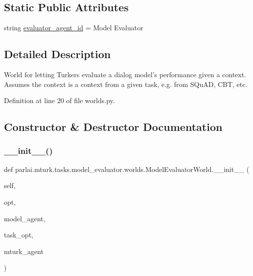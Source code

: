 \subsection*{Static Public Attributes}
\begin{DoxyCompactItemize}
\item 
string \hyperlink{classparlai_1_1mturk_1_1tasks_1_1model__evaluator_1_1worlds_1_1ModelEvaluatorWorld_aea1910aa8c33f072484f2328d1172c60}{evaluator\+\_\+agent\+\_\+id} = \textquotesingle{}Model Evaluator\textquotesingle{}
\end{DoxyCompactItemize}


\subsection{Detailed Description}
\begin{DoxyVerb}World for letting Turkers evaluate a dialog model's performance given a
context. Assumes the context is a context from a given task, e.g.
from SQuAD, CBT, etc.
\end{DoxyVerb}
 

Definition at line 20 of file worlds.\+py.



\subsection{Constructor \& Destructor Documentation}
\mbox{\label{classparlai_1_1mturk_1_1tasks_1_1model__evaluator_1_1worlds_1_1ModelEvaluatorWorld_aeb81d4953ba69b9b837d7af56cfd4fed}} 
\subsubsection{\texorpdfstring{\+\_\+\+\_\+init\+\_\+\+\_\+()}{\_\_init\_\_()}}
{\footnotesize\ttfamily def parlai.\+mturk.\+tasks.\+model\+\_\+evaluator.\+worlds.\+Model\+Evaluator\+World.\+\_\+\+\_\+init\+\_\+\+\_\+ (\begin{DoxyParamCaption}\item[{}]{self,  }\item[{}]{opt,  }\item[{}]{model\+\_\+agent,  }\item[{}]{task\+\_\+opt,  }\item[{}]{mturk\+\_\+agent }\end{DoxyParamCaption})}



